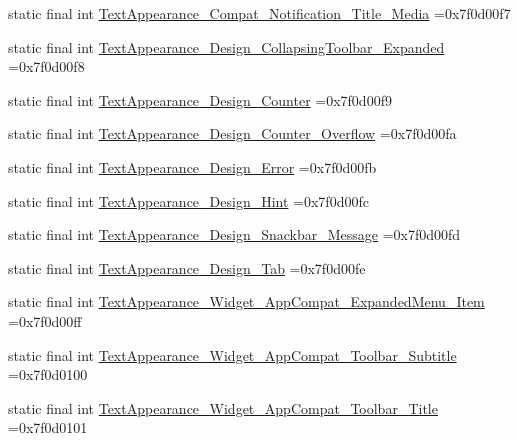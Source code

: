 \begin{DoxyCompactItemize}
static final int \mbox{\hyperlink{classcom_1_1example_1_1trainawearapplication_1_1_r_1_1style_a2ce8e5996ce2af2c589c3e6747b9ed59}{Text\+Appearance\+\_\+\+Compat\+\_\+\+Notification\+\_\+\+Title\+\_\+\+Media}} =0x7f0d00f7
\item 
static final int \mbox{\hyperlink{classcom_1_1example_1_1trainawearapplication_1_1_r_1_1style_a6b90190935afd439c90407c816676ab6}{Text\+Appearance\+\_\+\+Design\+\_\+\+Collapsing\+Toolbar\+\_\+\+Expanded}} =0x7f0d00f8
\item 
static final int \mbox{\hyperlink{classcom_1_1example_1_1trainawearapplication_1_1_r_1_1style_a6a5792936aeda9669547c2857cba26dc}{Text\+Appearance\+\_\+\+Design\+\_\+\+Counter}} =0x7f0d00f9
\item 
static final int \mbox{\hyperlink{classcom_1_1example_1_1trainawearapplication_1_1_r_1_1style_aadf781c9867b0b6e0b0fb542b0e4a268}{Text\+Appearance\+\_\+\+Design\+\_\+\+Counter\+\_\+\+Overflow}} =0x7f0d00fa
\item 
static final int \mbox{\hyperlink{classcom_1_1example_1_1trainawearapplication_1_1_r_1_1style_a6f2da548fc08abfd51254c38a8e8c4c7}{Text\+Appearance\+\_\+\+Design\+\_\+\+Error}} =0x7f0d00fb
\item 
static final int \mbox{\hyperlink{classcom_1_1example_1_1trainawearapplication_1_1_r_1_1style_ab9e35b4ab689a53b1f221ba1cbc23d53}{Text\+Appearance\+\_\+\+Design\+\_\+\+Hint}} =0x7f0d00fc
\item 
static final int \mbox{\hyperlink{classcom_1_1example_1_1trainawearapplication_1_1_r_1_1style_a5bf68f664550620ba27eb55826f1ce2c}{Text\+Appearance\+\_\+\+Design\+\_\+\+Snackbar\+\_\+\+Message}} =0x7f0d00fd
\item 
static final int \mbox{\hyperlink{classcom_1_1example_1_1trainawearapplication_1_1_r_1_1style_add88e6687ce28e53791b19716e183ab4}{Text\+Appearance\+\_\+\+Design\+\_\+\+Tab}} =0x7f0d00fe
\item 
static final int \mbox{\hyperlink{classcom_1_1example_1_1trainawearapplication_1_1_r_1_1style_a09ea4bb0f2c613acdf84e72c895e8f54}{Text\+Appearance\+\_\+\+Widget\+\_\+\+App\+Compat\+\_\+\+Expanded\+Menu\+\_\+\+Item}} =0x7f0d00ff
\item 
static final int \mbox{\hyperlink{classcom_1_1example_1_1trainawearapplication_1_1_r_1_1style_a239710f06281f229e60d2b171f081787}{Text\+Appearance\+\_\+\+Widget\+\_\+\+App\+Compat\+\_\+\+Toolbar\+\_\+\+Subtitle}} =0x7f0d0100
\item 
static final int \mbox{\hyperlink{classcom_1_1example_1_1trainawearapplication_1_1_r_1_1style_af3edcc52891c2802719113760a24daa9}{Text\+Appearance\+\_\+\+Widget\+\_\+\+App\+Compat\+\_\+\+Toolbar\+\_\+\+Title}} =0x7f0d0101

\end{DoxyCompactItemize}

